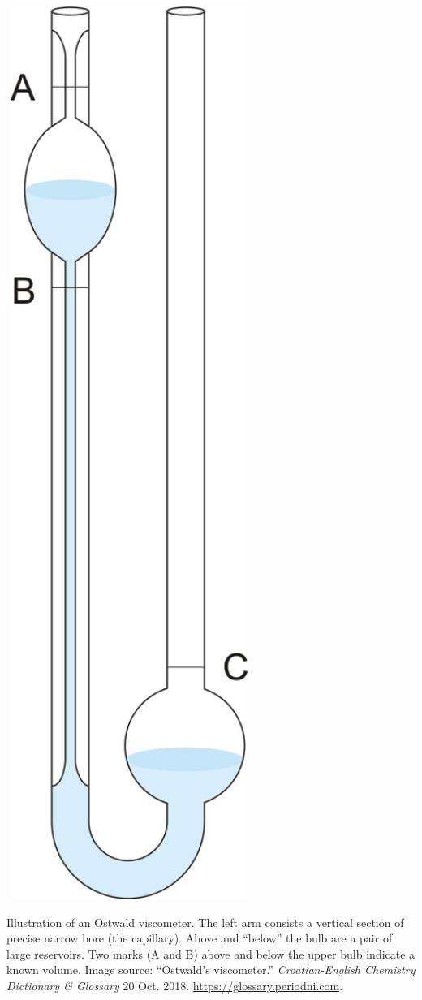 \documentclass[nobib,nofonts,nols,nohyper]{tufte-handout}
\begin{document}
\begin{marginfigure}
	\centering
	\includegraphics[width=0.6\textwidth]{images/ostwald_viscometer.png}
	\caption{Illustration of an Ostwald viscometer. 
		The left arm consists a vertical section of precise narrow bore (the capillary). 
		Above and ``below'' the bulb are a pair of large reservoirs.
		Two marks (A and B) above and below the upper bulb indicate a known volume. 
		\footnotesize{Image source: ``Ostwald’s viscometer.'' \emph{Croatian-English Chemistry Dictionary \& Glossary} 20 Oct. 2018. \url{https://glossary.periodni.com}.}}
	\label{fig:viscometer}
\end{marginfigure} 
\end{document}
